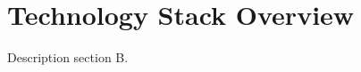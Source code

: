 \section{Technology Stack Overview}
\label{sect:technology-stack-overview}
Description section B.








